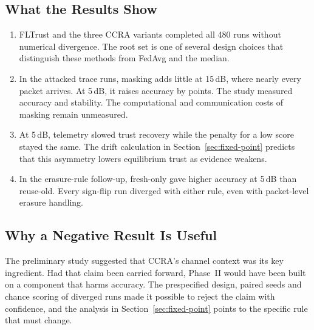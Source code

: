 \subsection{What the Results Show}
\begin{enumerate}
\item FLTrust and the three CCRA variants completed all 480 runs without
  numerical divergence. The root set is one of several design choices that
  distinguish these methods from FedAvg and the median.
\item In the attacked trace runs, masking adds little at 15\,dB, where nearly
  every packet arrives. At 5\,dB, it raises accuracy by \MaskGain{} points.
  The study measured accuracy and stability. The computational and communication
  costs of masking remain unmeasured.
\item At 5\,dB, telemetry slowed trust recovery while the penalty for a low score
  stayed the same. The drift calculation in Section~\ref{sec:fixed-point} predicts
  that this asymmetry lowers equilibrium trust as evidence weakens.
\item In the erasure-rule follow-up, fresh-only gave higher accuracy at 5\,dB
  than reuse-old. Every sign-flip run diverged with either rule, even with
  packet-level erasure handling.
\end{enumerate}

\subsection{Why a Negative Result Is Useful}
The preliminary study suggested that CCRA's channel context was its key ingredient.
Had that claim been carried forward, Phase~II would have been built on a component
that harms accuracy. The prespecified design, paired seeds and chance scoring of
diverged runs made it possible to reject the claim with confidence, and the
analysis in Section~\ref{sec:fixed-point} points to the specific rule that must
change.

